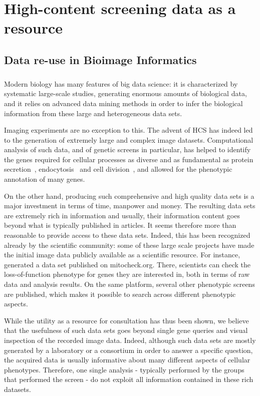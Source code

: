 
\chapter{High-content screening data as a resource}
\label{chap:reuse}
\section{Data re-use in Bioimage Informatics}
\paragraph*{}

Modern biology has many features of big data science: it is
characterized by systematic large-scale studies, generating enormous
amounts of biological data, and it relies on advanced data mining
methods in order to infer the biological information from these large
and heterogeneous data sets. 

Imaging experiments are no exception to this. The advent of HCS has indeed led to the generation of extremely large and complex image datasets. Computational analysis of such data, and of genetic screens in particular, has helped to identify the genes required for cellular processes as diverse and as fundamental as protein secretion~\cite{simpson2012genome}, endocytosis~\cite{collinet2010systems} and cell division~\cite{pmid20360735}, and allowed for the phenotypic annotation of many
genes.  

On the other hand, producing such comprehensive and high quality data
sets is a major investment in terms of time, manpower and money. The
resulting data sets are extremely rich in information and usually,
their information content goes beyond what is typically published in
articles. It seems therefore more than reasonable to provide access to
these data sets. Indeed, this has been recognized already by the
scientific community: some of these large scale
projects have made the initial image data publicly available as a
scientific resource. For instance, ~\cite{pmid20360735} generated a
data set published on mitocheck.org. There, scientists can check the
loss-of-function phenotype for genes they are interested in, both in
terms of raw data and analysis results. On the same
platform, several other phenotypic screens are published, which makes it possible to search across different phenotypic aspects. 


While the utility as a resource for consultation has thus been shown, we
believe that the usefulness of such data sets goes beyond single gene
queries and visual inspection of the recorded image data. Indeed, although such data sets are mostly generated  by a laboratory or a consortium in order to answer a specific question, the acquired
data is usually informative about many different aspects of cellular
phenotypes. Therefore, one single analysis - typically performed by
the groups that performed the screen - do not exploit all information
contained in these rich datasets. 

